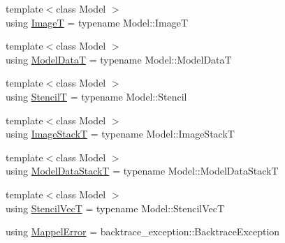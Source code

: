 \begin{DoxyCompactItemize}
\item 
{\footnotesize template$<$class Model $>$ }\\using \hyperlink{namespacemappel_a14658186b77757f3c35a69cb1be6cf4b}{ImageT} = typename Model\+::\+ImageT
\item 
{\footnotesize template$<$class Model $>$ }\\using \hyperlink{namespacemappel_a97f050df953605381ae9c901c3b125f1}{Model\+DataT} = typename Model\+::\+Model\+DataT
\item 
{\footnotesize template$<$class Model $>$ }\\using \hyperlink{namespacemappel_a3a06598240007876f8c4bf834ad86197}{StencilT} = typename Model\+::\+Stencil
\item 
{\footnotesize template$<$class Model $>$ }\\using \hyperlink{namespacemappel_a636dbe5b195c267a5f6a65cd48ff94a6}{Image\+StackT} = typename Model\+::\+Image\+StackT
\item 
{\footnotesize template$<$class Model $>$ }\\using \hyperlink{namespacemappel_aaeb6665bc57476dd93c2df6ad8bc4768}{Model\+Data\+StackT} = typename Model\+::\+Model\+Data\+StackT
\item 
{\footnotesize template$<$class Model $>$ }\\using \hyperlink{namespacemappel_a62f73447ef1973cca188b1b801864f7e}{Stencil\+VecT} = typename Model\+::\+Stencil\+VecT
\item 
using \hyperlink{namespacemappel_a9a55f6aee1523ba336066874a36dc29c}{Mappel\+Error} = backtrace\+\_\+exception\+::\+Backtrace\+Exception
\end{DoxyCompactItemize}
